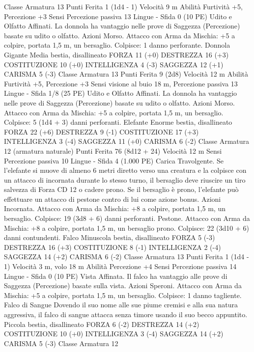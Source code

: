 \begin{multicols}{2}
Classe Armatura 13
Punti Ferita 1 (1d4 - 1)
Velocità 9 m
Abilità Furtività +5, Percezione +3
Sensi Percezione passiva 13
Lingue -
Sfida 0 (10 PE)
Udito e Olfatto Affinati. La donnola ha vantaggio nelle prove di
Saggezza (Percezione) basate su udito o olfatto.
Azioni
Morso. Attacco con Arma da Mischia: +5 a colpire, portata 1,5
m, un bersaglio.
Colpisce: 1 danno perforante.
Donnola Gigante
Media bestia, disallineato
FORZA 11 (+0)
DESTREZZA 16 (+3)
COSTITUZIONE 10 (+0)
INTELLIGENZA 4 (-3)
SAGGEZZA 12 (+1)
CARISMA 5 (-3)
Classe Armatura 13
Punti Ferita 9 (2d8)
Velocità 12 m
Abilità Furtività +5, Percezione +3
Sensi visione al buio 18 m, Percezione passiva 13
Lingue -
Sfida 1/8 (25 PE)
Udito e Olfatto Affinati. La donnola ha vantaggio nelle prove di
Saggezza (Percezione) basate su udito o olfatto.
Azioni
Morso. Attacco con Arma da Mischia: +5 a colpire, portata 1,5
m, un bersaglio.
Colpisce: 5 (1d4 + 3) danni perforanti.
Elefante
Enorme bestia, disallineato
FORZA 22 (+6)
DESTREZZA 9 (-1)
COSTITUZIONE 17 (+3)
INTELLIGENZA 3 (-4)
SAGGEZZA 11 (+0)
CARISMA 6 (-2)
Classe Armatura 12 (armatura naturale)
Punti Ferita 76 (8d12 + 24)
Velocità 12 m
Sensi Percezione passiva 10
Lingue -
Sfida 4 (1.000 PE)
Carica Travolgente. Se l’elefante si muove di almeno 6 metri
diretto verso una creatura e la colpisce con un attacco di
incornata durante lo stesso turno, il bersaglio deve riuscire un
tiro salvezza di Forza CD 12 o cadere prono. Se il bersaglio è
prono, l’elefante può effettuare un attacco di pestone contro di
lui come azione bonus.
Azioni
Incornata. Attacco con Arma da Mischia: +8 a colpire, portata
1,5 m, un bersaglio.
Colpisce: 19 (3d8 + 6) danni perforanti.
Pestone. Attacco con Arma da Mischia: +8 a colpire, portata 1,5
m, un bersaglio prono.
Colpisce: 22 (3d10 + 6) danni contundenti.
Falco
Minuscola bestia, disallineato
FORZA 5 (-3)
DESTREZZA 16 (+3)
COSTITUZIONE 8 (-1)
INTELLIGENZA 2 (-4)
SAGGEZZA 14 (+2)
CARISMA 6 (-2)
Classe Armatura 13
Punti Ferita 1 (1d4 - 1)
Velocità 3 m, volo 18 m
Abilità Percezione +4
Sensi Percezione passiva 14
Lingue -
Sfida 0 (10 PE)
Vista Affinata. Il falco ha vantaggio alle prove di Saggezza
(Percezione) basate sulla vista.
Azioni
Speroni. Attacco con Arma da Mischia: +5 a colpire, portata 1,5
m, un bersaglio.
Colpisce: 1 danno tagliente.
Falco di Sangue
Dovendo il suo nome alle sue piume cremisi e alla sua
natura aggressiva, il falco di sangue attacca senza
timore usando il suo becco appuntito.
Piccola bestia, disallineato
FORZA 6 (-2)
DESTREZZA 14 (+2)
COSTITUZIONE 10 (+0)
INTELLIGENZA 3 (-4)
SAGGEZZA 14 (+2)
CARISMA 5 (-3)
Classe Armatura 12

\end{multicols}
